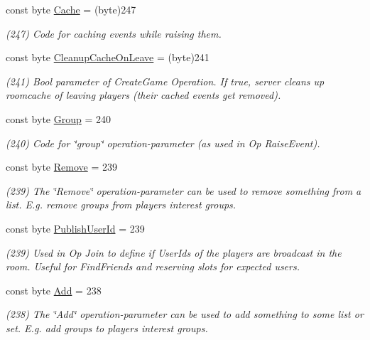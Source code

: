 \begin{DoxyCompactItemize}
const byte \hyperlink{class_exit_games_1_1_client_1_1_photon_1_1_parameter_code_a1b6065b6632880edd0321b1e3b8a2fb9}{Cache} = (byte)247
\begin{DoxyCompactList}\small\item\em (247) Code for caching events while raising them.\end{DoxyCompactList}\item 
const byte \hyperlink{class_exit_games_1_1_client_1_1_photon_1_1_parameter_code_a2a7ab40a8165c6fda2186d813ffe37b6}{Cleanup\+Cache\+On\+Leave} = (byte)241
\begin{DoxyCompactList}\small\item\em (241) Bool parameter of Create\+Game Operation. If true, server cleans up roomcache of leaving players (their cached events get removed).\end{DoxyCompactList}\item 
const byte \hyperlink{class_exit_games_1_1_client_1_1_photon_1_1_parameter_code_a008a132b4295de442fa7fe27eac3e2b9}{Group} = 240
\begin{DoxyCompactList}\small\item\em (240) Code for \char`\"{}group\char`\"{} operation-\/parameter (as used in Op Raise\+Event).\end{DoxyCompactList}\item 
const byte \hyperlink{class_exit_games_1_1_client_1_1_photon_1_1_parameter_code_ad82cf7aa56c20446c23e6f7b1c341a76}{Remove} = 239
\begin{DoxyCompactList}\small\item\em (239) The \char`\"{}\+Remove\char`\"{} operation-\/parameter can be used to remove something from a list. E.\+g. remove groups from player\textquotesingle{}s interest groups.\end{DoxyCompactList}\item 
const byte \hyperlink{class_exit_games_1_1_client_1_1_photon_1_1_parameter_code_a108e552f24426fdb1155733903ccb998}{Publish\+User\+Id} = 239
\begin{DoxyCompactList}\small\item\em (239) Used in Op Join to define if User\+Ids of the players are broadcast in the room. Useful for Find\+Friends and reserving slots for expected users.\end{DoxyCompactList}\item 
const byte \hyperlink{class_exit_games_1_1_client_1_1_photon_1_1_parameter_code_a413bb55ac84cebf0dd90e85640e14746}{Add} = 238
\begin{DoxyCompactList}\small\item\em (238) The \char`\"{}\+Add\char`\"{} operation-\/parameter can be used to add something to some list or set. E.\+g. add groups to player\textquotesingle{}s interest groups.\end{DoxyCompactList}\item 

\end{DoxyCompactItemize}
